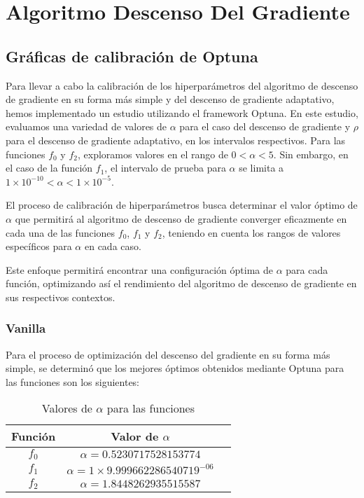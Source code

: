 \section{Algoritmo Descenso Del Gradiente}

\subsection{Gráficas de calibración de Optuna}
Para llevar a cabo la calibración de los hiperparámetros del algoritmo de descenso de gradiente en su forma más simple y del descenso de gradiente adaptativo, hemos implementado un estudio utilizando el framework Optuna. En este estudio, evaluamos una variedad de valores de $\alpha$ para el caso del descenso de gradiente y $\rho$ para el descenso de gradiente adaptativo, en los intervalos respectivos. Para las funciones $f_0$ y $f_2$, exploramos valores en el rango de $0 < \alpha < 5$. Sin embargo, en el caso de la función $f_1$, el intervalo de prueba para $\alpha$ se limita a $1 \times 10^{-10} < \alpha < 1 \times 10^{-5}$.


El proceso de calibración de hiperparámetros busca determinar el valor óptimo de $\alpha$ que permitirá al algoritmo de descenso de gradiente converger eficazmente en cada una de las funciones $f_0$, $f_1$ y $f_2$, teniendo en cuenta los rangos de valores específicos para $\alpha$ en cada caso.

Este enfoque permitirá encontrar una configuración óptima de $\alpha$ para cada función, optimizando así el rendimiento del algoritmo de descenso de gradiente en sus respectivos contextos.
\subsubsection{Vanilla}
Para el proceso de optimización del descenso del gradiente en su forma más simple, se determinó que los mejores óptimos obtenidos mediante Optuna para las funciones son los siguientes:

\begin{table}[H]
    \centering
    \caption{Valores de $\alpha$ para las funciones}
    \begin{tabular}{|c|c|c|}
    \hline
    \textbf{Función} & \textbf{Valor de $\alpha$} \\
    \hline
    $f_0$ & $\alpha = 0.5230717528153774$ \\
    \hline
    $f_1$ & $\alpha = 1 \times 9.999662286540719^{-06}$ \\
    \hline
    $f_2$ & $\alpha = 1.8448262935515587$ \\
    \hline
    \end{tabular}
    \label{tab:valores-alpha-vanilla}
\end{table}

